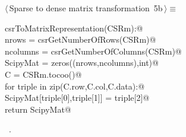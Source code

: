 \documentclass[11pt,oneside]{article}	%
\begin{document}
\begin{flushleft} \small
\begin{minipage}{\linewidth} \label{scrap10}
\protect{}$\langle\,$Sparse to dense matrix transformation\nobreak\ {\footnotesize 5b}$\,\rangle\equiv$
\vspace{-1ex}
\begin{list}{}{} \item
\mbox{}\verb@def csrToMatrixRepresentation(CSRm):@\\
\mbox{}\verb@    nrows = csrGetNumberOfRows(CSRm)@\\
\mbox{}\verb@    ncolumns = csrGetNumberOfColumns(CSRm)@\\
\mbox{}\verb@    ScipyMat = zeros((nrows,ncolumns),int)@\\
\mbox{}\verb@    C = CSRm.tocoo()@\\
\mbox{}\verb@    for triple in zip(C.row,C.col,C.data):@\\
\mbox{}\verb@        ScipyMat[triple[0],triple[1]] = triple[2]@\\
\mbox{}\verb@    return ScipyMat@\\
\mbox{}\verb@@{\NWsep}
\end{list}
\vspace{-1ex}
\footnotesize\addtolength{\baselineskip}{-1ex}
\begin{list}{}{\setlength{\itemsep}{-\parsep}\setlength{\itemindent}{-\leftmargin}}
\item \NWtxtMacroRefIn\ .
\end{list}
\end{minipage}\\[4ex]
\end{flushleft}
\end{document}
